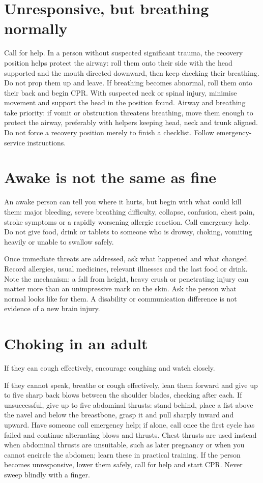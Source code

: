 \documentclass[10pt,openright]{book}
\begin{document}
\section*{Unresponsive, but breathing normally}
Call for help. In a person without suspected significant trauma, the recovery position helps protect the airway: roll them onto their side with the head supported and the mouth directed downward, then keep checking their breathing. Do not prop them up and leave. If breathing becomes abnormal, roll them onto their back and begin CPR. With suspected neck or spinal injury, minimise movement and support the head in the position found. Airway and breathing take priority: if vomit or obstruction threatens breathing, move them enough to protect the airway, preferably with helpers keeping head, neck and trunk aligned. Do not force a recovery position merely to finish a checklist. Follow emergency-service instructions.

\section*{Awake is not the same as fine}
An awake person can tell you where it hurts, but begin with what could kill them: major bleeding, severe breathing difficulty, collapse, confusion, chest pain, stroke symptoms or a rapidly worsening allergic reaction. Call emergency help. Do not give food, drink or tablets to someone who is drowsy, choking, vomiting heavily or unable to swallow safely.

Once immediate threats are addressed, ask what happened and what changed. Record allergies, usual medicines, relevant illnesses and the last food or drink. Note the mechanism: a fall from height, heavy crush or penetrating injury can matter more than an unimpressive mark on the skin. Ask the person what normal looks like for them. A disability or communication difference is not evidence of a new brain injury.

\section*{Choking in an adult}
If they can cough effectively, encourage coughing and watch closely.

If they cannot speak, breathe or cough effectively, lean them forward and give up to five sharp back blows between the shoulder blades, checking after each. If unsuccessful, give up to five abdominal thrusts: stand behind, place a fist above the navel and below the breastbone, grasp it and pull sharply inward and upward. Have someone call emergency help; if alone, call once the first cycle has failed and continue alternating blows and thrusts. Chest thrusts are used instead when abdominal thrusts are unsuitable, such as later pregnancy or when you cannot encircle the abdomen; learn these in practical training. If the person becomes unresponsive, lower them safely, call for help and start CPR. Never sweep blindly with a finger.
\end{document}
